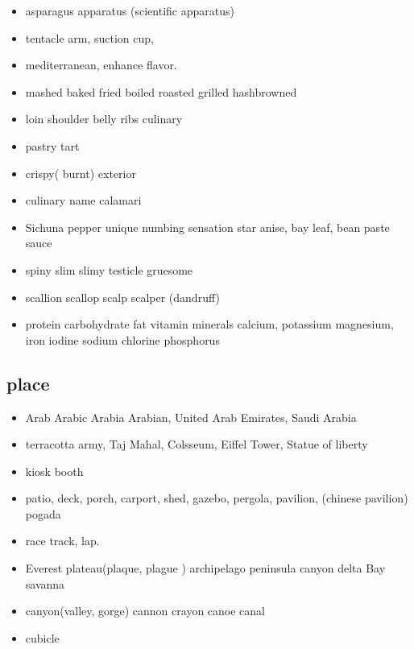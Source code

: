\documentclass[a4paper,11pt,twoside]{book}
\begin{document}
\begin{itemize}
	\item asparagus apparatus (scientific apparatus)
	\item tentacle arm, suction cup,
	
	\item mediterranean, enhance flavor. 
	
	\item mashed baked fried boiled roasted grilled hashbrowned 
	
	\item loin shoulder belly ribs culinary
	
	\item pastry tart 
	\item crispy( burnt) exterior
	
	\item culinary name calamari 
	
	\item Sichuna pepper unique numbing sensation  star anise, bay leaf, bean paste sauce
	\item spiny slim slimy testicle gruesome
	
	\item scallion scallop scalp scalper (dandruff)
	
	\item protein carbohydrate fat vitamin minerals calcium, potassium magnesium, iron iodine sodium chlorine phosphorus
	

	
\end{itemize}


\subsection{place}
\begin{itemize}
	\item Arab Arabic  Arabia Arabian, United Arab Emirates, Saudi Arabia
	
	\item terracotta army, Taj Mahal, Colsseum, Eiffel Tower, Statue of liberty
	
	\item kiosk booth
	
	\item patio, deck, porch, carport, shed, gazebo, pergola, pavilion, (chinese pavilion)  pogada
	
	
	\item race track, lap. 
	
	\item Everest plateau(plaque, plague ) archipelago peninsula canyon delta Bay savanna 
	
	\item canyon(valley, gorge) cannon crayon canoe canal
	
	\item cubicle 
	
\end{itemize}
\end{document}
